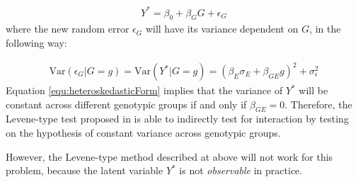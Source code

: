 \begin{equation}\label{equ:heteroskedasticLM}
\begin{aligned}
Y^* = \beta_0 + \beta_GG + \epsilon_G
\end{aligned}
\end{equation}
where the new random error $\epsilon_G$ will have its variance dependent on $G$, in the following way:

\begin{equation}\label{equ:heteroskedasticForm}
\begin{aligned}
\text{Var}(\epsilon_G | G = g) = \text{Var}(Y^* | G = g) = (\beta_E \sigma_E  + \beta_{GE} g)^2 + \sigma_\epsilon^2
\end{aligned}
\end{equation}
Equation \ref{equ:heteroskedasticForm} implies that the variance of $Y^*$ will be constant across different genotypic groups if and only if $\beta_{GE} = 0$. Therefore, the Levene-type test proposed in \citep{gjlst,jlst} is able to indirectly test for interaction by testing on the hypothesis of constant variance across genotypic groups.

However, the Levene-type method described at above will not work for this problem, because the latent variable $Y^*$ is not \textit{observable} in practice. 